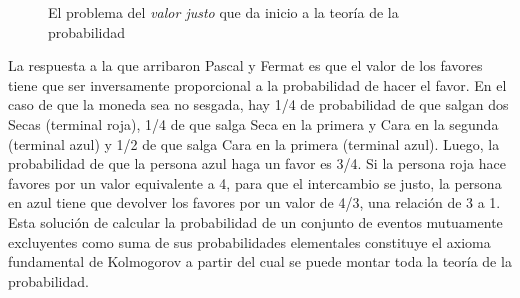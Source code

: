 \documentclass[a4paper,10pt]{book}
\theoremstyle{definition}
\begin{document}
\begin{figure}[ht!]
    \centering
    \caption{El problema del \emph{valor justo} que da inicio a la teor\'ia de la probabilidad}
    \label{fig:pascal-fermat}
\end{figure}

La respuesta a la que arribaron Pascal y Fermat es que el valor de los favores tiene que ser inversamente proporcional a la probabilidad de hacer el favor.
%
En el caso de que la moneda sea no sesgada, hay 1/4 de probabilidad de que salgan dos Secas (terminal roja), 1/4 de que salga Seca en la primera y Cara en la segunda (terminal azul) y 1/2 de que salga Cara en la primera (terminal azul).
%
Luego, la probabilidad de que la persona azul haga un favor es 3/4.
%
Si la persona roja hace favores por un valor equivalente a 4, para que el intercambio se justo, la persona en azul tiene que devolver los favores por un valor de 4/3, una relaci\'on de 3 a 1.
%
Esta soluci\'on de calcular la probabilidad de un conjunto de eventos mutuamente excluyentes como suma de sus probabilidades elementales constituye el axioma fundamental de Kolmogorov a partir del cual se puede montar toda la teor\'ia de la probabilidad.

\end{document}
